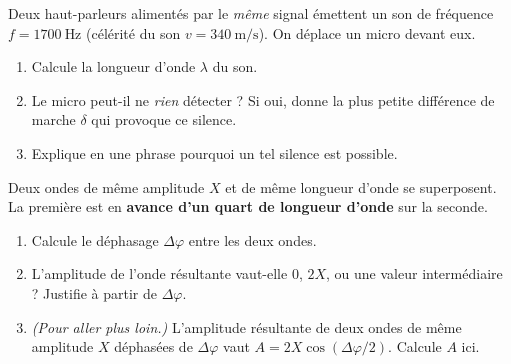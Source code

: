 \documentclass[11pt,a4paper]{article}
\begin{document}
\begin{exo}
Deux haut-parleurs alimentés par le \emph{même} signal émettent un son de fréquence
$f=\SI{1700}{\hertz}$ (célérité du son $v=\SI{340}{\metre\per\second}$). On déplace un micro
devant eux.
\begin{center}
\end{center}
\begin{enumerate}[label=\alph*)]
  \item Calcule la longueur d'onde $\lambda$ du son.
  \item Le micro peut-il ne \emph{rien} détecter ? Si oui, donne la plus petite différence de
        marche $\delta$ qui provoque ce silence.
  \item Explique en une phrase pourquoi un tel silence est possible.
\end{enumerate}
\end{exo}

\begin{exo}
Deux ondes de même amplitude $X$ et de même longueur d'onde se superposent. La première est en
\textbf{avance d'un quart de longueur d'onde} sur la seconde.
\begin{enumerate}[label=\alph*)]
  \item Calcule le déphasage $\Delta\varphi$ entre les deux ondes.
  \item L'amplitude de l'onde résultante vaut-elle $0$, $2X$, ou une valeur intermédiaire ?
        Justifie à partir de $\Delta\varphi$.
  \item \emph{(Pour aller plus loin.)} L'amplitude résultante de deux ondes de même amplitude
        $X$ déphasées de $\Delta\varphi$ vaut $A=2X\cos(\Delta\varphi/2)$. Calcule $A$ ici.
\end{enumerate}
\end{exo}
\end{document}
